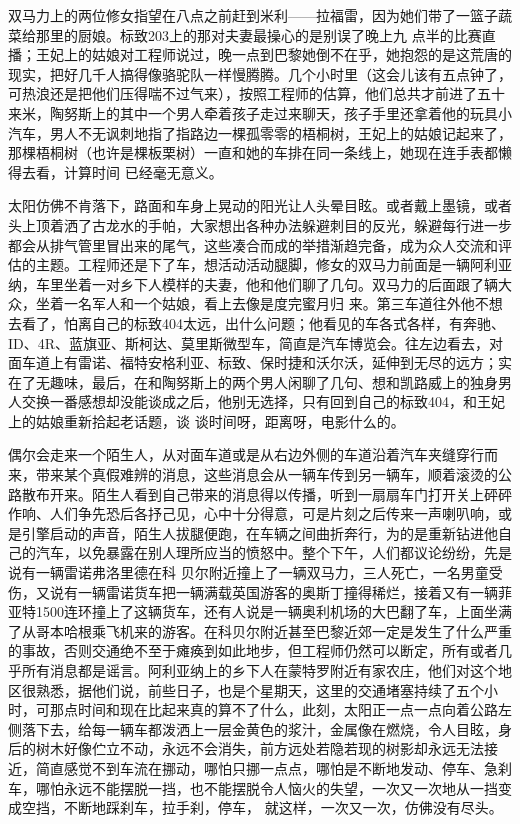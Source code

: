 \documentclass{article}
\begin{document}
双马力上的两位修女指望在八点之前赶到米利——拉福雷，因为她们带了一篮子蔬菜给那里的厨娘。标致203上的那对夫妻最操心的是别误了晚上九
\newpage
点半的比赛直播；王妃上的姑娘对工程师说过，晚一点到巴黎她倒不在乎，她抱怨的是这荒唐的现实，把好几千人搞得像骆驼队一样慢腾腾。几个小时里（这会儿该有五点钟了，可热浪还是把他们压得喘不过气来），按照工程师的估算，他们总共才前进了五十来米，陶努斯上的其中一个男人牵着孩子走过来聊天，孩子手里还拿着他的玩具小汽车，男人不无讽刺地指了指路边一棵孤零零的梧桐树，王妃上的姑娘记起来了，那棵梧桐树（也许是棵板栗树）一直和她的车排在同一条线上，她现在连手表都懒得去看，计算时间
已经毫无意义。 

太阳仿佛不肯落下，路面和车身上晃动的阳光让人头晕目眩。或者戴上墨镜，或者头上顶着洒了古龙水的手帕，大家想出各种办法躲避刺目的反光，躲避每行进一步都会从排气管里冒出来的尾气，这些凑合而成的举措渐趋完备，成为众人交流和评估的主题。工程师还是下了车，想活动活动腿脚，修女的双马力前面是一辆阿利亚纳，车里坐着一对乡下人模样的夫妻，他和他们聊了几句。双马力的后面跟了辆大众，坐着一名军人和一个姑娘，看上去像是度完蜜月归
\newpage
来。第三车道往外他不想去看了，怕离自己的标致404太远，出什么问题；他看见的车各式各样，有奔驰、ID、4R、蓝旗亚、斯柯达、莫里斯微型车，简直是汽车博览会。往左边看去，对面车道上有雷诺、福特安格利亚、标致、保时捷和沃尔沃，延伸到无尽的远方；实在了无趣味，最后，在和陶努斯上的两个男人闲聊了几句、想和凯路威上的独身男人交换一番感想却没能谈成之后，他别无选择，只有回到自己的标致404，和王妃上的姑娘重新拾起老话题，谈
谈时间呀，距离呀，电影什么的。 

偶尔会走来一个陌生人，从对面车道或是从右边外侧的车道沿着汽车夹缝穿行而来，带来某个真假难辨的消息，这些消息会从一辆车传到另一辆车，顺着滚烫的公路散布开来。陌生人看到自己带来的消息得以传播，听到一扇扇车门打开关上砰砰作响、人们争先恐后各抒己见，心中十分得意，可是片刻之后传来一声喇叭响，或是引擎启动的声音，陌生人拔腿便跑，在车辆之间曲折奔行，为的是重新钻进他自己的汽车，以免暴露在别人理所应当的愤怒中。整个下午，人们都议论纷纷，先是说有一辆雷诺弗洛里德在科
\newpage
贝尔附近撞上了一辆双马力，三人死亡，一名男童受伤，又说有一辆雷诺货车把一辆满载英国游客的奥斯丁撞得稀烂，接着又有一辆菲亚特1500连环撞上了这辆货车，还有人说是一辆奥利机场的大巴翻了车，上面坐满了从哥本哈根乘飞机来的游客。在科贝尔附近甚至巴黎近郊一定是发生了什么严重的事故，否则交通绝不至于瘫痪到如此地步，但工程师仍然可以断定，所有或者几乎所有消息都是谣言。阿利亚纳上的乡下人在蒙特罗附近有家农庄，他们对这个地区很熟悉，据他们说，前些日子，也是个星期天，这里的交通堵塞持续了五个小时，可那点时间和现在比起来真的算不了什么，此刻，太阳正一点一点向着公路左侧落下去，给每一辆车都泼洒上一层金黄色的浆汁，金属像在燃烧，令人目眩，身后的树木好像伫立不动，永远不会消失，前方远处若隐若现的树影却永远无法接近，简直感觉不到车流在挪动，哪怕只挪一点点，哪怕是不断地发动、停车、急刹车，哪怕永远不能摆脱一挡，也不能摆脱令人恼火的失望，一次又一次地从一挡变成空挡，不断地踩刹车，拉手刹，停车，
就这样，一次又一次，仿佛没有尽头。 
\end{document}
